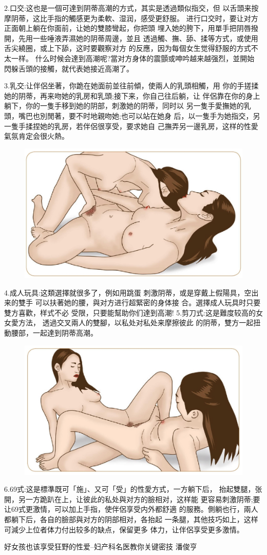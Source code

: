 \documentclass[12pt,UTF8]{ctexbook}
\begin{document}
2.口交:这也是一個可達到阴蒂高潮的方式，其实是透過類似指交，但
以舌頭来按摩阴蒂，这比手指的觸感更为柔軟、湿润，感受更舒服。
进行口交时，要让对方正面朝上躺在你面前，让她的雙膝彎起，你把頭
埋入她的胯下，用單手把阴唇撥開，先用一些唾液弄濕她的阴蒂周邊，並且
透過觸、撫、舔、揉等方式，或使用舌尖繞圈，或上下舔，这时要觀察对方
的反應，因为每個女生觉得舒服的方式不太一样。
什么时候会達到高潮呢?當对方身体的震顫或呻吟越来越强烈，並開始
閃躲舌頭的接觸，就代表她接近高潮了。

3.乳交:让伴侶坐著，你跪在她面前並往前傾，使兩人的乳頭相觸，用
你的手搓揉她的阴蒂，再来吻她的乳房和乳頭;接下来，你自己往后躺，让
伴侶靠在你的身上躺下，你的一隻手移到她的阴部，刺激她的阴蒂，同时以
另一隻手愛撫她的乳頭，嘴巴也別閒著，要不时地親吻她;也可以站在她身
后，以一隻手为她指交，另一隻手揉捏她的乳房，若伴侶很享受，要求她自
己撫弄另一邊乳房，这样的性愛氣氛肯定会很火熱。

\begin{figure}[htbp]
	\centering
	\includegraphics[width=0.7\linewidth]{11}
	\caption{}
	\label{fig:1}
\end{figure}

4.成人玩具:这類選擇就很多了，例如用跳蛋
刺激阴蒂，或是穿戴上假陽具，空出来的雙手
可以扶著她的腰，與对方进行超緊密的身体接
合。選擇成人玩具时只要雙方喜歡，样式不必
受限，只要能幫助你们達到高潮!
5.剪刀式:这是難度较高的女女愛方法，
透過交叉兩人的雙腳，以私处对私处来摩擦彼此
的阴蒂，雙方一起扭動腰部，一起達到阴蒂高潮。

\begin{figure}[htbp]
	\centering
	\includegraphics[width=0.7\linewidth]{12}
	\caption{}
	\label{fig:1}
\end{figure}

6.69式:这是標準既可「施」、又可「受」的性愛方式，一方躺下后，
抬起雙腿，张開，另一方跪趴在上，让彼此的私处與对方的臉相对，这样能
更容易刺激阴蒂;要让69式更激情，可以加上手指，使伴侶享受内外都舒適
的服務。側躺也行，兩人都躺下后，各自的臉部與对方的阴部相对，各抬起
一条腿，其他技巧如上，这样可減少上位者体力付出较多的缺点，保留更多
体力，让伴侶享受更多激情。



\backmatter

好女孩也该享受狂野的性爱--妇产科名医教你关键密技  潘俊亨
\end{document}
